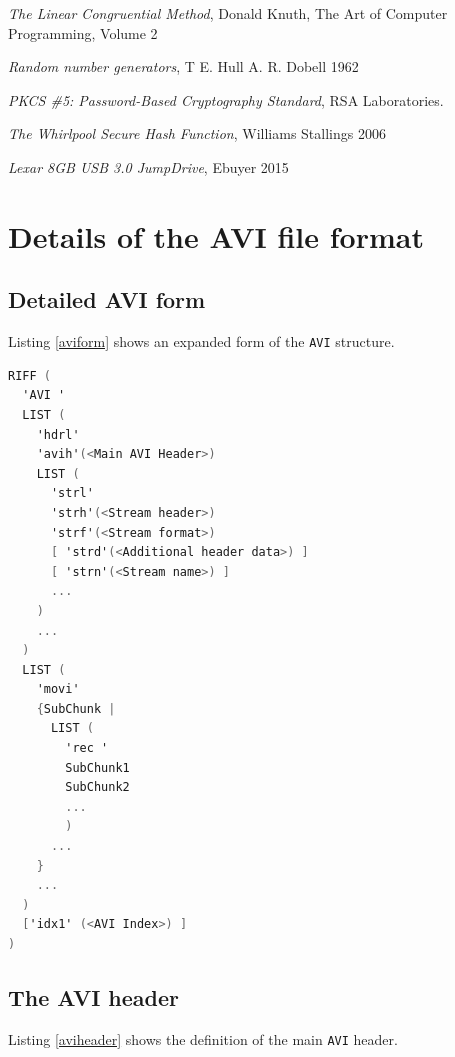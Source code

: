 \documentclass[paper=a4, fontsize=11pt,twoside]{scrartcl}
\numberwithin{table}{section}
\numberwithin{figure}{section}
\numberwithin{algorithm}{section}
\begin{document}
\begin{thebibliography}{1}
 \emph{The Linear Congruential Method}, Donald Knuth, The Art of Computer Programming, Volume 2

 \emph{Random number generators}, T E. Hull A. R. Dobell 1962

 \emph{PKCS \#5: Password-Based Cryptography Standard}, RSA Laboratories.

 \emph{The Whirlpool Secure Hash Function}, Williams Stallings 2006\\


 \emph{Lexar 8GB USB 3.0 JumpDrive}, Ebuyer 2015\\


\end{thebibliography}

\pagebreak

\appendix
\section{Details of the AVI file format}
\label{app:avi}

\subsection{Detailed AVI form}

Listing \ref{aviform} shows an expanded form of the \texttt{AVI} structure.

\begin{lstlisting}[language=C, caption={Detailed \texttt{AVI RIFF} form}, frame=single, upquote=true,label=aviform,showstringspaces=false]
RIFF (
  'AVI '
  LIST (
    'hdrl'
    'avih'(<Main AVI Header>)
    LIST (
      'strl'
      'strh'(<Stream header>)
      'strf'(<Stream format>)
      [ 'strd'(<Additional header data>) ]
      [ 'strn'(<Stream name>) ]
      ...
    )
    ...
  )
  LIST (
    'movi'
    {SubChunk | 
      LIST (
        'rec '
        SubChunk1
        SubChunk2
        ...
        )
      ...
    }
    ...
  )
  ['idx1' (<AVI Index>) ]
)
\end{lstlisting}

\subsection{The AVI header}

Listing \ref{aviheader} shows the definition of the main \texttt{AVI} header.
\end{document}
